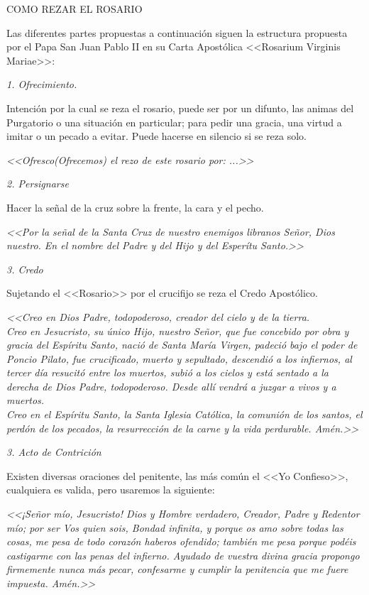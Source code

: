 \documentclass[12pt, letterpaper]{report}
\begin{document}
    \LARGE COMO REZAR EL ROSARIO

    \Large Las diferentes partes propuestas a continuaci\'on siguen la estructura propuesta por el Papa San Juan Pablo II en su Carta Apostólica <<Rosarium Virginis Mariae>>:
    
    \LARGE \textit{1. Ofrecimiento.}
    
    \Large Intención por la cual se reza el rosario, puede ser por un difunto, las animas del Purgatorio o una situación en particular; para pedir una gracia, una virtud a imitar o un pecado a evitar. Puede hacerse en silencio si se reza solo.
    
    \textit{<<Ofresco(Ofrecemos) el rezo de este rosario por: ...>>}
    
    \LARGE \textit{2. Persignarse}
    
    \Large Hacer la señal de la cruz sobre la frente, la cara y el pecho. 
    
    \textit{<<Por la señal de la Santa Cruz de nuestro enemigos libranos Señor, Dios nuestro. En el nombre del Padre y del Hijo y del Esperítu Santo.>>}
    
    \LARGE \textit{3. Credo}
    
    \Large Sujetando el <<Rosario>> por el crucifijo se reza el Credo Apostólico.
    
    \textit{<<Creo en Dios Padre, todopoderoso, creador del cielo y de la tierra.\\
    Creo en Jesucristo, su único Hijo, nuestro Señor, que fue concebido por obra y gracia del Espíritu Santo, nació de Santa María Virgen, padeció bajo el poder de Poncio Pilato, fue crucificado, muerto y sepultado, descendió a los infiernos, al tercer día resucitó entre los muertos, subió a los cielos y está sentado a la derecha de Dios Padre, todopoderoso. Desde allí vendrá a juzgar a vivos y a muertos.\\
    Creo en el Espíritu Santo, la Santa Iglesia Católica, la comunión de los santos, el perdón de los pecados, la resurrección de la carne y la vida perdurable. Amén.>>}
    
    \LARGE \textit{3. Acto de Contrición}
    
    \Large Existen diversas oraciones del penitente, las más común el <<Yo Confieso>>, cualquiera es valida, pero usaremos la siguiente:
    
    \textit{<<¡Señor mío, Jesucristo! Dios y Hombre verdadero, Creador, Padre y Redentor mío; por ser Vos quien sois, Bondad infinita, y porque os amo sobre todas las cosas, me pesa de todo corazón haberos ofendido; también me pesa porque podéis castigarme con las penas del infierno. Ayudado de vuestra divina gracia propongo firmemente nunca más pecar, confesarme y cumplir la penitencia que me fuere impuesta. Amén.>>}
    
\end{document}
